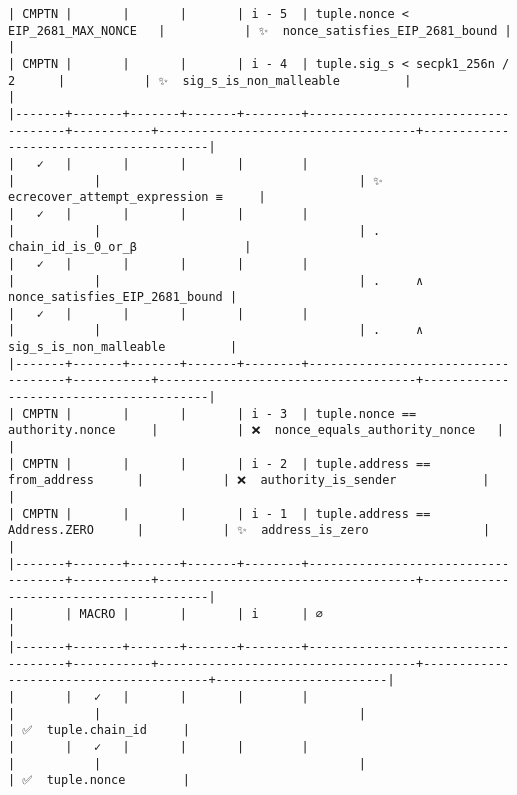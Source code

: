 \documentclass[varwidth=\maxdimen,margin=0.5cm,multi={verbatim}]{standalone}
\begin{document}
\begin{verbatim}
| CMPTN |       |       |       | i - 5  | tuple.nonce < EIP_2681_MAX_NONCE   |           | ✨  nonce_satisfies_EIP_2681_bound |                                        |
| CMPTN |       |       |       | i - 4  | tuple.sig_s < secpk1_256n / 2      |           | ✨  sig_s_is_non_malleable         |                                        |
|-------+-------+-------+-------+--------+------------------------------------+-----------+------------------------------------+----------------------------------------|
|   ✓   |       |       |       |        |                                    |           |                                    | ✨  ecrecover_attempt_expression ≡     |
|   ✓   |       |       |       |        |                                    |           |                                    | .     chain_id_is_0_or_β               |
|   ✓   |       |       |       |        |                                    |           |                                    | .     ∧ nonce_satisfies_EIP_2681_bound |
|   ✓   |       |       |       |        |                                    |           |                                    | .     ∧ sig_s_is_non_malleable         |
|-------+-------+-------+-------+--------+------------------------------------+-----------+------------------------------------+----------------------------------------|
| CMPTN |       |       |       | i - 3  | tuple.nonce == authority.nonce     |           | ❌  nonce_equals_authority_nonce   |                                        |
| CMPTN |       |       |       | i - 2  | tuple.address == from_address      |           | ❌  authority_is_sender            |                                        |
| CMPTN |       |       |       | i - 1  | tuple.address == Address.ZERO      |           | ✨  address_is_zero                |                                        |
|-------+-------+-------+-------+--------+------------------------------------+-----------+------------------------------------+----------------------------------------|
|       | MACRO |       |       | i      | ∅                                  | 
|-------+-------+-------+-------+--------+------------------------------------+-----------+------------------------------------+----------------------------------------+------------------------|
|       |   ✓   |       |       |        |                                    |           |                                    |                                        | ✅  tuple.chain_id     |
|       |   ✓   |       |       |        |                                    |           |                                    |                                        | ✅  tuple.nonce        |

\end{verbatim}
\end{document}
